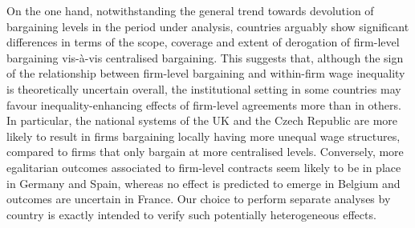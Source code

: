 \documentclass[12pt]{article}
\begin{document}
On the one hand, notwithstanding the general trend towards devolution of bargaining levels in the period under analysis, countries arguably show significant differences in terms of the scope, coverage and extent of derogation of firm-level bargaining vis-à-vis centralised bargaining. This suggests that, although the sign of the relationship between firm-level bargaining and within-firm wage inequality is theoretically uncertain overall, the institutional setting in some countries may favour inequality-enhancing effects of firm-level agreements more than in others. In particular, the national systems of the UK and the Czech Republic are more likely to result in firms bargaining locally having more unequal wage structures, compared to firms that only bargain at more centralised levels. Conversely, more egalitarian outcomes associated to firm-level contracts seem likely to be in place in Germany and Spain, whereas no effect is predicted to emerge in Belgium and outcomes are uncertain in France. Our choice to perform separate analyses by country is exactly intended to verify such potentially heterogeneous effects.
\end{document}
